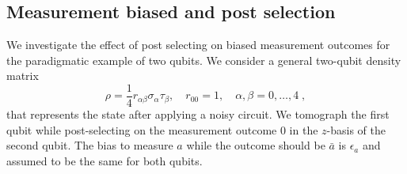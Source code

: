 \documentclass[two column]{article}
\begin{document}
 
\subsection{Measurement biased and post selection}\label{app:bias} We investigate the effect of post selecting on biased measurement outcomes for the paradigmatic example of two qubits. We consider a general two-qubit density matrix
\begin{equation}
	\rho=\frac{1}{4} r_{\alpha \beta} \sigma_\alpha \tau_\beta,\quad r_{00}=1,\quad \alpha,\beta=0,\ldots,4\;,
\end{equation} that represents the state after applying a noisy circuit. We tomograph the first qubit while post-selecting on the measurement outcome $0$ in the $z$-basis of the second qubit. The bias to measure $a$ while the outcome should be $\bar a$ is $\epsilon_a$ and assumed to be the same for both qubits. 
\end{document}
